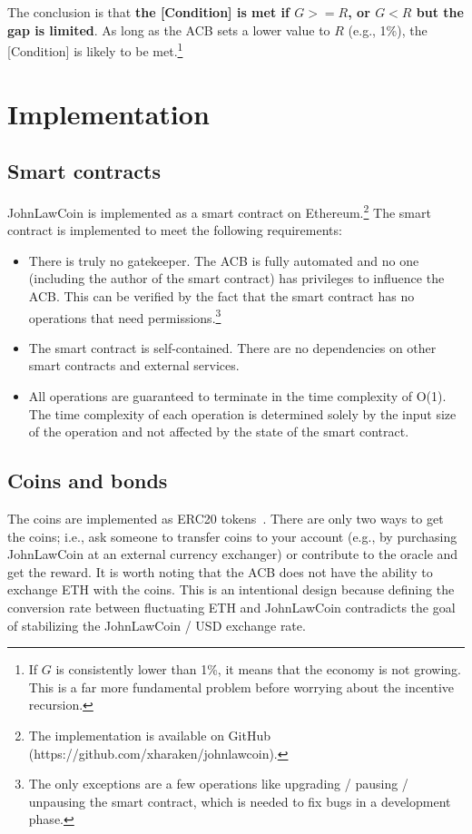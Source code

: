 \documentclass[dvipdfmx,a4paper]{article}
\begin{document}
The conclusion is that \textbf{the [Condition] is met if $G>=R$, or $G<R$ but the gap is limited}. As long as the ACB sets a lower value to $R$ (e.g., 1\%), the [Condition] is likely to be met.\footnote{If $G$ is consistently lower than 1\%, it means that the economy is not growing. This is a far more fundamental problem before worrying about the incentive recursion.}

\section{Implementation}

\subsection{Smart contracts}

JohnLawCoin is implemented as a smart contract on Ethereum.\footnote{The implementation is available on GitHub (https://github.com/xharaken/johnlawcoin).} The smart contract is implemented to meet the following requirements:

\begin{itemize}
\item There is truly no gatekeeper. The ACB is fully automated and no one (including the author of the smart contract) has privileges to influence the ACB. This can be verified by the fact that the smart contract has no operations that need permissions.\footnote{The only exceptions are a few operations like upgrading / pausing / unpausing the smart contract, which is needed to fix bugs in a development phase.}
\item The smart contract is self-contained. There are no dependencies on other smart contracts and external services.
\item All operations are guaranteed to terminate in the time complexity of O(1). The time complexity of each operation is determined solely by the input size of the operation and not affected by the state of the smart contract.
\end{itemize}

\subsection{Coins and bonds}

The coins are implemented as ERC20 tokens~\cite{erc20token}. There are only two ways to get the coins; i.e., ask someone to transfer coins to your account (e.g., by purchasing JohnLawCoin at an external currency exchanger) or contribute to the oracle and get the reward. It is worth noting that the ACB does not have the ability to exchange ETH with the coins. This is an intentional design because defining the conversion rate between fluctuating ETH and JohnLawCoin contradicts the goal of stabilizing the JohnLawCoin / USD exchange rate.
\end{document}
